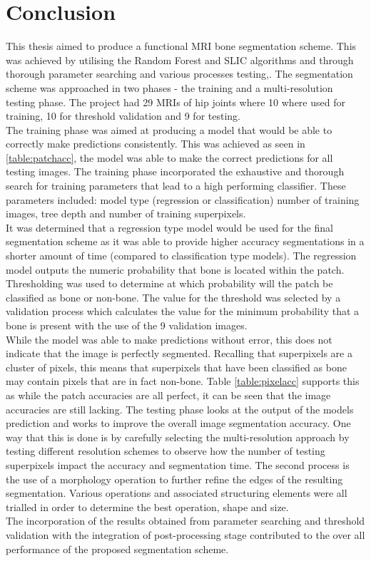 \chapter{Conclusion}

This thesis aimed to produce a functional MRI bone segmentation scheme. This was achieved by utilising the Random Forest and SLIC algorithms and through thorough parameter searching and various processes testing,. The segmentation scheme was approached in two phases - the training and a multi-resolution testing phase. The project had 29 MRIs of hip joints where 10 where used for training, 10 for threshold validation and 9 for testing.
\\[1\baselineskip]
The training phase was aimed at producing a model that would be able to correctly make predictions consistently. This was achieved as seen in \ref{table:patchacc}, the model was able to make the correct predictions for all testing images. The training phase incorporated the exhaustive and thorough search for training parameters that lead to a high performing classifier. These parameters included: model type (regression or classification) number of training images, tree depth and number of training superpixels. 
\\[1\baselineskip]
It was determined that a regression type model would be used for the final segmentation scheme as it was able to provide higher accuracy segmentations in a shorter amount of time (compared to classification type models). The regression model outputs the numeric probability that bone is located within the patch. Thresholding was used to determine at which probability will the patch be classified as bone or non-bone. The value for the threshold was selected by a validation process which calculates the value for the minimum probability that a bone is present with the use of the 9 validation images. 
\\[1\baselineskip]
While the model was able to make predictions without error, this does not indicate that the image is perfectly segmented. Recalling that superpixels are a cluster of pixels, this means that superpixels that have been classified as bone may contain pixels that are in fact non-bone. Table \ref{table:pixelacc} supports this as while the patch accuracies are all perfect, it can be seen that the image accuracies are still lacking. The testing phase looks at the output of the models prediction and works to improve the overall image segmentation accuracy. One way that this is done is by carefully selecting the multi-resolution approach by testing different resolution schemes to observe how the number of testing superpixels impact the accuracy and segmentation time. The second process is the use of a morphology operation to further refine the edges of the resulting segmentation. Various operations and associated structuring elements were all trialled in order to determine the best operation, shape and size. 
\\[1\baselineskip]
The incorporation of the results obtained from parameter searching and threshold validation with the integration of post-processing stage contributed to the over all performance of the proposed segmentation scheme.

